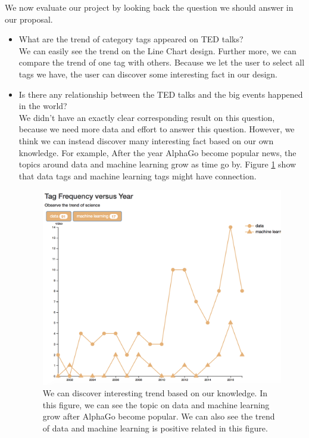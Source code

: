 \documentclass{report}
\numberwithin{figure}{section}
\begin{document}
\quad We now evaluate our project by looking back the question we should answer in our proposal.
\begin{itemize}
\item
What are the trend of category tags appeared on TED talks?
\\
\quad We can easily see the trend on the Line Chart design. Further more, we can compare the trend of one tag with others. Because we let the user to select all tags we have, the user can discover some interesting fact in our design.

\item
Is there any relationship between the TED talks and the big events happened in the world? 
\\
\quad We didn't have an exactly clear corresponding result on this question, because we need more data and effort to answer this question. However, we think we can instead discover many interesting fact based on our own knowledge. For example, After the year AlphaGo become popular news, the topics around data and machine learning grow as time go by. Figure \ref{fig:dataml} show that data tags and machine learning tags might have connection.


\begin{figure}
\begin{center}
\includegraphics[scale=0.4]{dataml}
\caption{We can discover interesting trend based on our knowledge. In this figure, we can see the topic on data and machine learning grow after AlphaGo become popular. We can also see the trend of data and machine learning is positive related in this figure.}
\label{fig:dataml}
\end{center}
\end{figure} 




\end{itemize}
\end{document}

